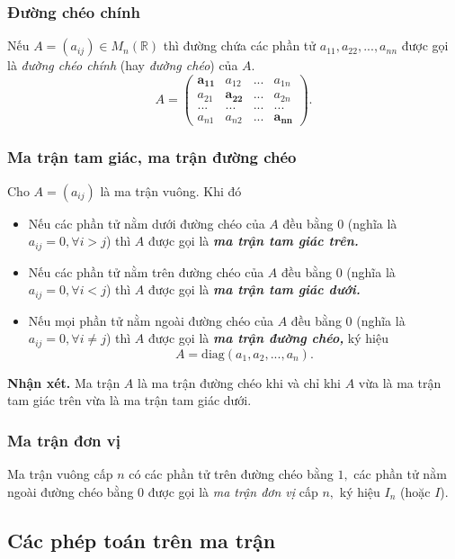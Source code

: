 \subsubsection{Đường chéo chính}
Nếu $A = \left( {{a_{ij}}} \right) \in {M_n}\left( \mathbb{R} \right)$ thì đường chứa các phần tử $a_{11}, a_{22}, ..., a_{nn}$ được gọi là \textit{đường chéo chính} (hay \textit{đường chéo}) của $A.$
$$A = \left( {\begin{array}{*{20}{c}}
  {\mathbf{a_{11}}}&{{a_{12}}}&{...}&{{a_{1n}}} \\ 
  {{a_{21}}}&{\mathbf{a_{22}}}&{...}&{{a_{2n}}} \\ 
  {...}&{...}&{...}&{...} \\ 
  {{a_{n1}}}&{{a_{n2}}}&{...}&{\mathbf{a_{nn}}} 
\end{array}} \right).$$
\subsubsection{Ma trận tam giác, ma trận đường chéo}
Cho $A = \left( {a_{ij}} \right)$ là ma trận vuông. Khi đó
\begin{itemize}
\item Nếu các phần tử nằm dưới đường chéo của $A$ đều bằng $0$ (nghĩa là $a_{ij} = 0, \forall i > j$) thì $A$ được gọi là \textbf{\textit{ma trận tam giác trên.}}
\item Nếu các phần tử nằm trên đường chéo của $A$ đều bằng $0$ (nghĩa là $a_{ij} = 0, \forall i < j$) thì $A$ được gọi là \textbf{\textit{ma trận tam giác dưới.}}
\item Nếu mọi phần tử nằm ngoài đường chéo của $A$ đều bằng $0$ (nghĩa là $a_{ij} = 0, \forall i \ne j$) thì $A$ được gọi là \textbf{\textit{ma trận đường chéo,}} ký hiệu
$$A = \mathrm{diag}\left( {{a_1},{a_2},...,{a_n}} \right).$$
\end{itemize}
\begin{mybox}
\textbf{Nhận xét.} Ma trận $A$ là ma trận đường chéo khi và chỉ khi $A$ vừa là ma trận tam giác trên vừa là ma trận tam giác dưới.
\end{mybox}
\subsubsection{Ma trận đơn vị}
Ma trận vuông cấp $n$ có các phần tử trên đường chéo bằng $1,$ các phần tử nằm ngoài đường chéo bằng $0$ được gọi là \textit{ma trận đơn vị} cấp $n,$ ký hiệu $I_n$ (hoặc $I$).
\subsection{Các phép toán trên ma trận}
